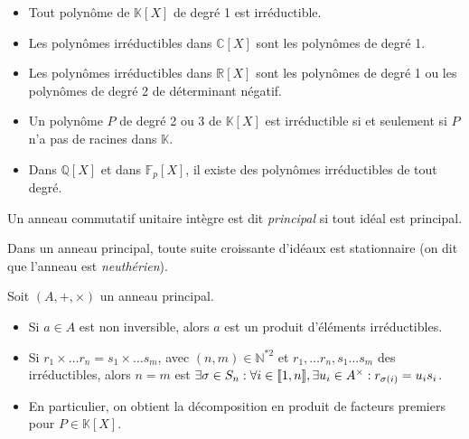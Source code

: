 \begin{prop}\begin{itemize}
    \item Tout polynôme de $\mathbb{K}[X]$ de degré 1 est irréductible.
    \item Les polynômes irréductibles dans $\mathbb{C}[X]$ sont les polynômes de degré 1.
    \item Les polynômes irréductibles dans $\mathbb{R}[X]$ sont les polynômes de degré 1 ou les polynômes de degré 2 de déterminant négatif.
    \item Un polynôme $P$ de degré 2 ou 3 de $\mathbb{K}[X]$ est irréductible si et seulement si $P$ n'a pas de racines dans $\mathbb{K}$.
    \item Dans $\mathbb{Q}[X]$ et dans $\mathbb{F}_p[X]$, il existe des polynômes irréductibles de tout degré.
\end{itemize}\end{prop}

\begin{defi} Un anneau commutatif unitaire intègre est dit \emph{principal} si tout idéal est principal.
\end{defi}

\begin{prop} Dans un anneau principal, toute suite croissante d'idéaux est stationnaire (on dit que l'anneau est \emph{neuthérien}).
\end{prop}

\begin{theo} Soit $(A,+,\times)$ un anneau principal.\begin{itemize}
    \item Si $a\in A$ est non inversible, alors $a$ est un produit d'éléments irréductibles.
    \item Si $r_1\times\dots r_n=s_1\times\dots s_m$, avec $(n,m)\in\mathbb{N}^{*2}$ et $r_1,\dots r_n,s_1\dots s_m$ des irréductibles, alors $n=m$ est $\exists\sigma\in S_n:\forall i\in\llbracket 1, n \rrbracket, \exists u_i\in A^\times: r_{\sigma(i)} = u_i s_i$.
    \item En particulier, on obtient la décomposition en produit de facteurs premiers pour $P\in\mathbb{K}[X]$.
\end{itemize}\end{theo}

